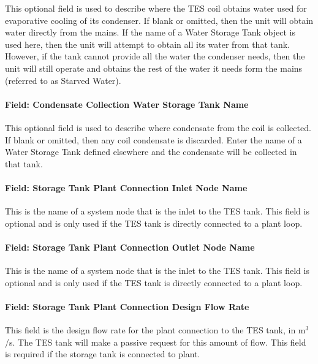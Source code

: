 This optional field is used to describe where the TES coil obtains water used for evaporative cooling of its condenser. If blank or omitted, then the unit will obtain water directly from the mains. If the name of a Water Storage Tank object is used here, then the unit will attempt to obtain all its water from that tank. However, if the tank cannot provide all the water the condenser needs, then the unit will still operate and obtains the rest of the water it needs form the mains (referred to as Starved Water).

\paragraph{Field: Condensate Collection Water Storage Tank Name}\label{field-condensate-collection-water-storage-tank-name-7}

This optional field is used to describe where condensate from the coil is collected. If blank or omitted, then any coil condensate is discarded. Enter the name of a Water Storage Tank defined elsewhere and the condensate will be collected in that tank.

\paragraph{Field: Storage Tank Plant Connection Inlet Node Name}\label{field-storage-tank-plant-connection-inlet-node-name}

This is the name of a system node that is the inlet to the TES tank. This field is optional and is only used if the TES tank is directly connected to a plant loop.

\paragraph{Field: Storage Tank Plant Connection Outlet Node Name}\label{field-storage-tank-plant-connection-outlet-node-name}

This is the name of a system node that is the inlet to the TES tank. This field is optional and is only used if the TES tank is directly connected to a plant loop.

\paragraph{Field: Storage Tank Plant Connection Design Flow Rate}\label{field-storage-tank-plant-connection-design-flow-rate}

This field is the design flow rate for the plant connection to the TES tank, in m\(^{3}\)/s. The TES tank will make a passive request for this amount of flow. This field is required if the storage tank is connected to plant.

